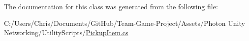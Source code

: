 The documentation for this class was generated from the following file\+:\begin{DoxyCompactItemize}
\item 
C\+:/\+Users/\+Chris/\+Documents/\+Git\+Hub/\+Team-\/\+Game-\/\+Project/\+Assets/\+Photon Unity Networking/\+Utility\+Scripts/\hyperlink{_pickup_item_8cs}{Pickup\+Item.\+cs}\end{DoxyCompactItemize}
